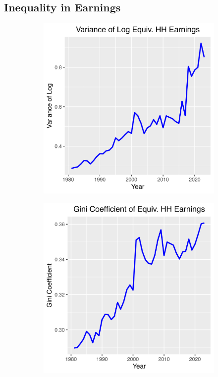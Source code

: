 \documentclass{article}
\begin{document}
\subsection{Inequality in Earnings}

\begin{figure}
    \centering
    \begin{subfigure}[t]{0.475\textwidth}
        \centering
        \includegraphics[width=\textwidth]{figures/Fig_1/Fig_1a_Var_Earnings.png}
    \end{subfigure}
    \begin{subfigure}[t]{0.475\textwidth}
        \centering
        \includegraphics[width=\textwidth]{figures/Fig_1/Fig_1b_Gini_Earnings.png}

\end{subfigure}
\end{figure}
\end{document}

